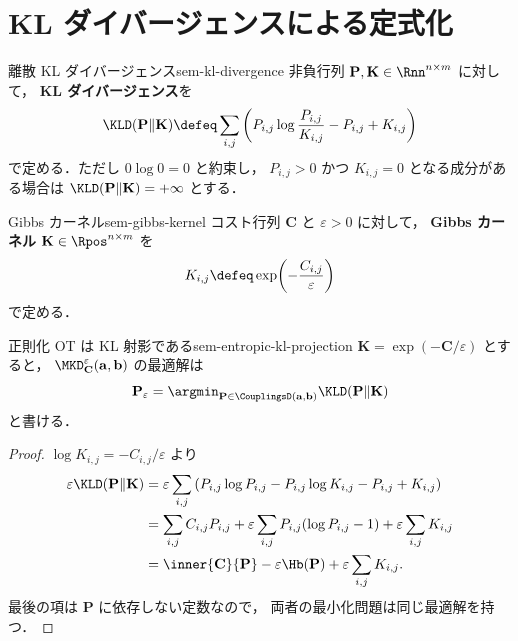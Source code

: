 \section{KL ダイバージェンスによる定式化}
\label{sec:sem-kl-formulation}

\begin{definition}{離散 KL ダイバージェンス}{sem-kl-divergence}
  非負行列 $\mathbf{P}, \mathbf{K} \in \Rnn^{n \times m}$ に対して，
  \textbf{KL ダイバージェンス}を
  \[
    \KLD(\mathbf{P} \| \mathbf{K})
    \defeq
    \sum_{i,j}
    \left(
      P_{i,j}\log\frac{P_{i,j}}{K_{i,j}}
      - P_{i,j} + K_{i,j}
    \right)
  \]
  で定める．ただし $0\log 0 = 0$ と約束し，
  $P_{i,j} > 0$ かつ $K_{i,j}=0$ となる成分がある場合は
  $\KLD(\mathbf{P}\|\mathbf{K}) = +\infty$ とする．
\end{definition}

\begin{definition}{Gibbs カーネル}{sem-gibbs-kernel}
  コスト行列 $\mathbf{C}$ と $\varepsilon > 0$ に対して，
  \textbf{Gibbs カーネル} $\mathbf{K} \in \Rpos^{n \times m}$ を
  \[
    K_{i,j} \defeq \exp\!\left(-\frac{C_{i,j}}{\varepsilon}\right)
  \]
  で定める．
\end{definition}

\begin{proposition}{正則化 OT は KL 射影である}{sem-entropic-kl-projection}
  $\mathbf{K} = \exp(-\mathbf{C}/\varepsilon)$ とすると，
  $\MKD_{\mathbf{C}}^\varepsilon(\mathbf{a}, \mathbf{b})$ の最適解は
  \[
    \mathbf{P}_\varepsilon
    =
    \argmin_{\mathbf{P} \in \CouplingsD(\mathbf{a}, \mathbf{b})}
    \KLD(\mathbf{P}\|\mathbf{K})
  \]
  と書ける．
\end{proposition}

\begin{proof}
  $\log K_{i,j} = -C_{i,j}/\varepsilon$ より
  \begin{align*}
    \varepsilon \KLD(\mathbf{P}\|\mathbf{K})
    &=
    \varepsilon\sum_{i,j}
    \left(
      P_{i,j}\log P_{i,j}
      - P_{i,j}\log K_{i,j}
      - P_{i,j}
      + K_{i,j}
    \right) \\
    &=
    \sum_{i,j} C_{i,j}P_{i,j}
    + \varepsilon\sum_{i,j} P_{i,j}(\log P_{i,j}-1)
    + \varepsilon\sum_{i,j} K_{i,j} \\
    &=
    \inner{\mathbf{C}}{\mathbf{P}} - \varepsilon \Hb(\mathbf{P})
    + \varepsilon\sum_{i,j} K_{i,j}.
  \end{align*}
  最後の項は $\mathbf{P}$ に依存しない定数なので，
  両者の最小化問題は同じ最適解を持つ．
\end{proof}

